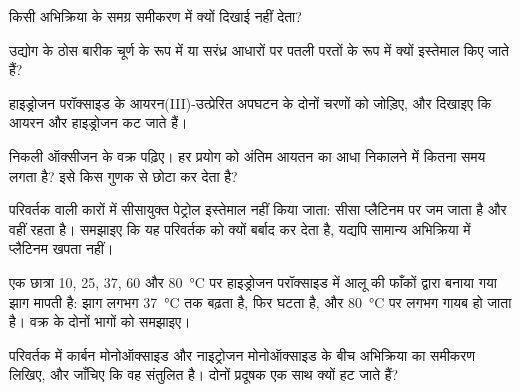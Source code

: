 \begin{exercise}[$\star$]\label{exo:g12:catalysis:4}
 किसी अभिक्रिया के समग्र समीकरण में क्यों दिखाई नहीं देता?
\end{exercise}

\begin{exercise}[$\star$]\label{exo:g12:catalysis:5}
उद्योग के ठोस  बारीक चूर्ण के रूप में या सरंध्र आधारों पर पतली
परतों के रूप में क्यों इस्तेमाल किए जाते हैं?
\end{exercise}

\begin{exercise}[$\star\star$]\label{exo:g12:catalysis:6}
हाइड्रोजन परॉक्साइड के आयरन(III)-उत्प्रेरित अपघटन के दोनों चरणों को जोड़िए,
और दिखाइए कि आयरन  और हाइड्रोजन  कट जाते हैं।
\end{exercise}

\begin{exercise}[$\star\star$]\label{exo:g12:catalysis:7}
निकली ऑक्सीजन के वक्र पढ़िए। हर प्रयोग को अंतिम आयतन का आधा
निकालने में कितना समय लगता है?  इसे किस गुणक से
छोटा कर देता है?
\end{exercise}

\begin{exercise}[$\star\star$]\label{exo:g12:catalysis:8}
 परिवर्तक वाली कारों में सीसायुक्त पेट्रोल इस्तेमाल नहीं किया जाता: सीसा
प्लैटिनम पर जम जाता है और वहीं रहता है। समझाइए कि यह परिवर्तक को क्यों बर्बाद कर देता है,
यद्यपि सामान्य अभिक्रिया में प्लैटिनम खपता नहीं।
\end{exercise}

\begin{exercise}[$\star\star$]\label{exo:g12:catalysis:9}
एक छात्रा 10, 25, 37, 60 और \qty{80}{\celsius} पर हाइड्रोजन
परॉक्साइड में आलू की फाँकों द्वारा बनाया गया झाग मापती है: झाग
लगभग \qty{37}{\celsius} तक बढ़ता है, फिर घटता है, और \qty{80}{\celsius} पर लगभग
गायब हो जाता है। वक्र के दोनों भागों को समझाइए।
\end{exercise}

\begin{exercise}[$\star\star$]\label{exo:g12:catalysis:10}
 परिवर्तक में कार्बन मोनोऑक्साइड और नाइट्रोजन मोनोऑक्साइड के बीच
अभिक्रिया का समीकरण लिखिए, और जाँचिए कि वह संतुलित है।
दोनों प्रदूषक एक साथ क्यों हट जाते हैं?
\end{exercise}

